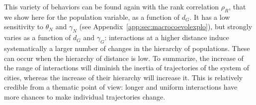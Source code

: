 This variety of behaviors can be found again with the rank correlation $\rho_R$, that we show here for the population variable, as a function of $d_G$. It has a low sensitivity to $\theta_N$ and $\gamma_N$ (see Appendix~\ref{app:sec:macrocoevolexplo}), but strongly varies as a function of $d_G$ and $\gamma_G$: interactions at a higher distance induce systematically a larger number of changes in the hierarchy of populations. These can occur when the hierarchy of distance is low. To summarize, the increase of the range of interactions will diminish the inertia of trajectories of the system of cities, whereas the increase of their hierarchy will increase it. This is relatively credible from a thematic point of view: longer and uniform interactions have more chances to make individual trajectories change.




